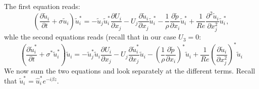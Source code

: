 \documentclass{jfm}
\begin{document}
The first equation reads:
%
\begin{equation}
\left( \frac{\partial \tilde{u}_i}{\partial t} + \sigma \tilde{u}_i \right) \tilde{u}^*_i =
- \tilde{u}_j \tilde{u}_i^* \frac{\partial U_i}{\partial x_j} - U_j \frac{\partial \tilde{u}_i}{\partial x_j} \tilde{u}_i^*
- \frac{1}{\rho} \frac{\partial \tilde{p}}{\partial x_i} \tilde{u}_i^* 
+ \frac{1}{Re} \frac{\partial^2 \tilde{u}_i}{\partial x_j^2} \tilde{u}_i^*,
\end{equation}
whle the second equations reads (recall that in our case $U_3=0$:
\begin{equation}
\left( \frac{\partial \tilde{u}_i^*}{\partial t} + \sigma^* \tilde{u}_i^* \right) \tilde{u}_i = 
- \tilde{u}_j^* \tilde{u}_i \frac{\partial U_i}{\partial x_j} - U_j \frac{\partial \tilde{u}_i^*}{\partial x_j} \tilde{u}_i
- \left( \frac{1}{\rho} \frac{\partial \tilde{p}}{\partial x_i} \right)^* \tilde{u}_i + 
\frac{1}{Re} \left( \frac{\partial \tilde{u}_i}{\partial x_j^2} \right)^* \tilde{u}_i
\end{equation}
%
We now sum the two equations and look separately at the different terms. Recall that $\tilde{u}_i^* = \hat{u}_i^* e^{-i\beta z}$.
\end{document}
